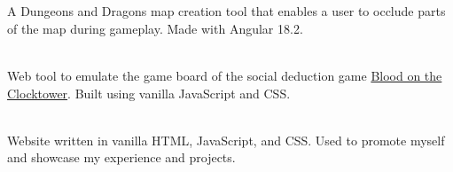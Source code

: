\documentclass[10pt,a4paper,ragged2e,withhyper]{altacv}
\begin{document}

\\\smallskip
{}


 \\\smallskip
A Dungeons and Dragons map creation tool that enables a user to occlude parts of the map during gameplay. Made with Angular 18.2.

\divider

 \\\smallskip
Web tool to emulate the game board of the social deduction game \href{https://bloodontheclocktower.com/}{Blood on the Clocktower}. Built using vanilla JavaScript and CSS.

\divider

 \\\smallskip
Website written in vanilla HTML, JavaScript, and CSS.
Used to promote myself and showcase my experience
and projects.




\smallskip
{}
\begin{paracol}{4}
\switchcolumn[1]
\switchcolumn[2]
\switchcolumn[3]
\end{paracol}
\end{document}
